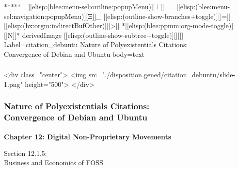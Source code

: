 \begin{whenOrg}
\begin{whenOrg}
*****  _[[elisp:(blee:menu-sel:outline:popupMenu)][±]]_ _[[elisp:(blee:menu-sel:navigation:popupMenu)][Ξ]]_ [[elisp:(outline-show-branches+toggle)][|=]] [[elisp:(bx:orgm:indirectBufOther)][|>]] *[[elisp:(blee:ppmm:org-mode-toggle)][|N]]*  derivedImage [[elisp:(outline-show-subtree+toggle)][||]] Label=citation_debuntu Nature of Polyexistentials Citations:\\ Convergence of Debian and Ubuntu body=text
\end{whenOrg}

\begin{htmlonly}

\begin{frame}[fragile,plain,label=citation_debuntu]
    \frametitle{}
    \framesubtitle{}
    \begin{rawhtml}
<div class="center">
<img src="./disposition.gened/citation_debuntu/slide-1.png" height="500">
</div>
    \end{rawhtml}
\end{frame}
\end{htmlonly}

\begin{verblatex}

\begin{frame}[fragile,plain,label=citation_debuntu]
    \frametitle{Nature of Polyexistentials Citations:\\ Convergence of Debian and Ubuntu}
    \framesubtitle{}

    \begin{center}
      \begin{large}
        \textbf{Chapter 12: Digital Non-Proprietary Movements}
      \end{large}
  \end{center}

    \bigskip

  \begin{large}
Section 12.1.5:\\[10pt] Business and Economics of FOSS
  \end{large}


\end{frame}
\end{verblatex}
\end{whenOrg}

